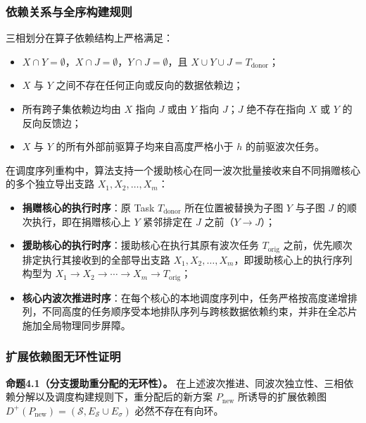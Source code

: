 \documentclass[anonymous,notoc]{gmcm2026}
\providecommand{\tightlist}{\setlength{\itemsep}{0pt}\setlength{\parskip}{0pt}}
\begin{document}
\subsubsection{依赖关系与全序构建规则}

三相划分在算子依赖结构上严格满足：

\begin{itemize}
\tightlist
\item
  \(X \cap Y = \emptyset\)，\(X \cap J = \emptyset\)，\(Y \cap J = \emptyset\)，且 \(X \cup Y \cup J = T_{\mathrm{donor}}\)；
\item
  \(X\) 与 \(Y\) 之间不存在任何正向或反向的数据依赖边；
\item
  所有跨子集依赖边均由 \(X\) 指向 \(J\) 或由 \(Y\) 指向 \(J\)；\(J\) 绝不存在指向 \(X\) 或 \(Y\) 的反向反馈边；
\item
  \(X\) 与 \(Y\) 的所有外部前驱算子均来自高度严格小于 \(h\) 的前驱波次任务。
\end{itemize}

在调度序列重构中，算法支持一个援助核心在同一波次批量接收来自不同捐赠核心的多个独立导出支路 \(X_1, X_2, \dots, X_m\)：

\begin{itemize}
\tightlist
\item
  \textbf{捐赠核心的执行时序}：原 Task \(T_{\mathrm{donor}}\) 所在位置被替换为子图 \(Y\) 与子图 \(J\) 的顺次执行，即在捐赠核心上 \(Y\) 紧邻排定在 \(J\) 之前（\(Y \to J\)）；
\item
  \textbf{援助核心的执行时序}：援助核心在执行其原有波次任务 \(T_{\mathrm{orig}}\) 之前，优先顺次排定执行其接收到的全部导出支路 \(X_1, X_2, \dots, X_m\)，即援助核心上的执行序列构型为 \(X_1 \to X_2 \to \cdots \to X_m \to T_{\mathrm{orig}}\)；
\item
  \textbf{核心内波次推进时序}：在每个核心的本地调度序列中，任务严格按高度递增排列，不同高度的任务顺序受本地排队序列与跨核数据依赖约束，并非在全芯片施加全局物理同步屏障。
\end{itemize}

\subsubsection{扩展依赖图无环性证明}

\textbf{命题4.1（分支援助重分配的无环性）。} 在上述波次推进、同波次独立性、三相依赖分解以及调度构建规则下，重分配后的新方案 \(P_{\mathrm{new}}\) 所诱导的扩展依赖图 \(D^+(P_{\mathrm{new}}) = (\mathcal{S}, E_{\mathcal{S}} \cup E_\sigma)\) 必然不存在有向环。
\end{document}
